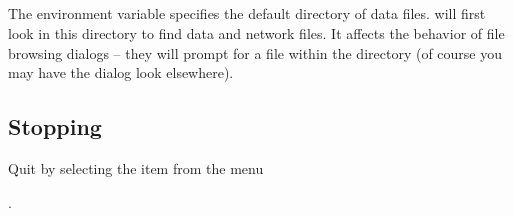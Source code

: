 \subsection{}
\label{sec:scirundata}

The environment variable  specifies the default
directory of \sr{} data files.  \sr will first look in this directory to
find data and network files.  It affects the behavior of file browsing
dialogs -- they will prompt for a file within the 
directory (of course you may have the dialog look elsewhere).


\subsection{Stopping}
\label{sec:stopping}

Quit \sr{} by selecting the  item from the  menu

.


